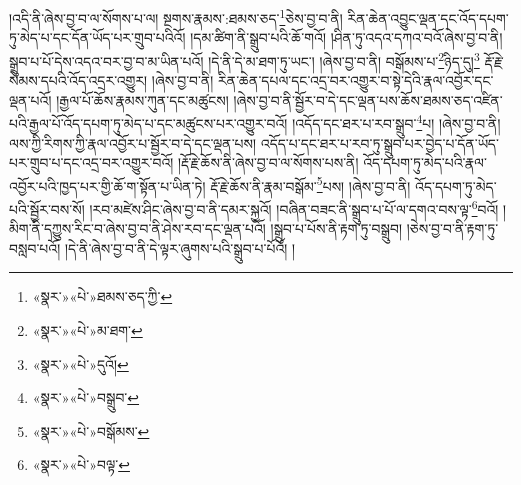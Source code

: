 །འདི་ནི་ཞེས་བྱ་བ་ལ་སོགས་པ་ལ། སྔགས་རྣམས་:ཐམས་ཅད་\footnote{«སྣར་»«པེ་»ཐམས་ཅད་ཀྱི་}ཅེས་བྱ་བ་ནི། རིན་ཆེན་འབྱུང་ལྡན་དང་འོད་དཔག་ཏུ་མེད་པ་དང་དོན་ཡོད་པར་གྲུབ་པའིའོ། །དམ་ཚིག་ནི་སྒྲུབ་པའི་ཆོ་གའོ། །ཤིན་ཏུ་འདའ་དཀའ་བའོ་ཞེས་བྱ་བ་ནི། སྒྲུབ་པ་པོ་དེས་འདའ་བར་བྱ་བ་མ་ཡིན་པའོ། །དེ་ནི་དེ་མ་ཐག་ཏུ་ཡང་། །ཞེས་བྱ་བ་ནི། བསྒོམས་པ་\footnote{«སྣར་»«པེ་»མ་ཐག་}ཉིད་དུ།\footnote{«སྣར་»«པེ་»དུའོ།} རྡོ་རྗེ་སེམས་དཔའི་འོད་འདྲར་འགྱུར། །ཞེས་བྱ་བ་ནི། རིན་ཆེན་དཔལ་དང་འདྲ་བར་འགྱུར་བ་སྟེ་དེའི་རྣལ་འབྱོར་དང་ལྡན་པའོ། །རྒྱལ་པོ་ཆོས་རྣམས་ཀུན་དང་མཚུངས། །ཞེས་བྱ་བ་ནི་སྦྱོར་བ་དེ་དང་ལྡན་པས་ཆོས་ཐམས་ཅད་འཛིན་པའི་རྒྱལ་པོ་འོད་དཔག་ཏུ་མེད་པ་དང་མཚུངས་པར་འགྱུར་བའོ། །འདོད་དང་ཐར་པ་རབ་སྒྲུབ་\footnote{«སྣར་»«པེ་»བསྒྲུབ་}པ། །ཞེས་བྱ་བ་ནི། ལས་ཀྱི་རིགས་ཀྱི་རྣལ་འབྱོར་པ་སྦྱོར་བ་དེ་དང་ལྡན་པས། འདོད་པ་དང་ཐར་པ་རབ་ཏུ་སྒྲུབ་པར་བྱེད་པ་དོན་ཡོད་པར་གྲུབ་པ་དང་འདྲ་བར་འགྱུར་བའོ། །རྡོ་རྗེ་ཆོས་ནི་ཞེས་བྱ་བ་ལ་སོགས་པས་ནི། འོད་དཔག་ཏུ་མེད་པའི་རྣལ་འབྱོར་པའི་ཁྱད་པར་གྱི་ཆོ་ག་སྟོན་པ་ཡིན་ཏེ། རྡོ་རྗེ་ཆོས་ནི་རྣམ་བསྒོམ་\footnote{«སྣར་»«པེ་»བསྒོམས་}པས། །ཞེས་བྱ་བ་ནི། འོད་དཔག་ཏུ་མེད་པའི་སྦྱོར་བས་སོ། །རབ་མཛེས་ཤིང་ཞེས་བྱ་བ་ནི་དམར་སྐྱའོ། །བཞིན་བཟང་ནི་སྒྲུབ་པ་པོ་ལ་དགའ་བས་ལྟ་\footnote{«སྣར་»«པེ་»བལྟ་}བའོ། །མིག་ནི་དཀྱུས་རིང་བ་ཞེས་བྱ་བ་ནི་ཤེས་རབ་དང་ལྡན་པའོ། །སྒྲུབ་པ་པོས་ནི་རྟག་ཏུ་བསྒྲུབ། །ཅེས་བྱ་བ་ནི་རྟག་ཏུ་བསླབ་པའོ། །དེ་ནི་ཞེས་བྱ་བ་ནི་དེ་ལྟར་ཞུགས་པའི་སྒྲུབ་པ་པོའོ། །

